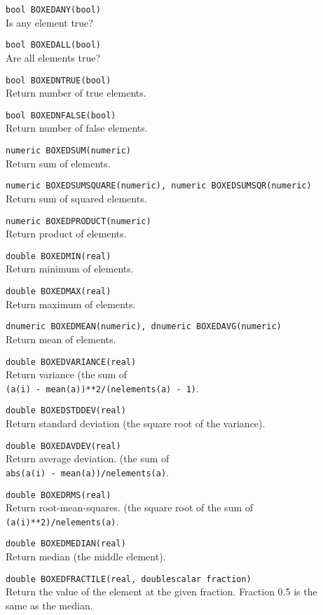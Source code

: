 \begin{description}
  \item[] \texttt{bool BOXEDANY(bool)}\\
    Is any element true?
  \item[] \texttt{bool BOXEDALL(bool)}\\
    Are all elements true?
  \item[] \texttt{bool BOXEDNTRUE(bool)}\\
    Return number of true elements.
  \item[] \texttt{bool BOXEDNFALSE(bool)}\\
    Return number of false elements.
  \item[] \texttt{numeric BOXEDSUM(numeric)}\\
    Return sum of elements.
  \item[] \texttt{numeric BOXEDSUMSQUARE(numeric), numeric BOXEDSUMSQR(numeric)}\\
    Return sum of squared elements.
  \item[] \texttt{numeric BOXEDPRODUCT(numeric)}\\
    Return product of elements.
  \item[] \texttt{double BOXEDMIN(real)}\\
    Return minimum of elements.
  \item[] \texttt{double BOXEDMAX(real)}\\
    Return maximum of elements.
  \item[] \texttt{dnumeric BOXEDMEAN(numeric), dnumeric BOXEDAVG(numeric)}\\
    Return mean of elements.
  \item[] \texttt{double BOXEDVARIANCE(real)}\\
    Return variance (the sum of
    \\\texttt{(a(i) - mean(a))**2/(nelements(a) - 1)}.
  \item[] \texttt{double BOXEDSTDDEV(real)}\\
    Return standard deviation (the square root of the variance).
  \item[] \texttt{double BOXEDAVDEV(real)}\\
    Return average deviation. (the sum of 
    \\\texttt{abs(a(i) - mean(a))/nelements(a)}.
  \item[] \texttt{double BOXEDRMS(real)}\\
    Return root-mean-squares. (the square root of the sum of
    \\\texttt{(a(i)**2)/nelements(a)}.
  \item[] \texttt{double BOXEDMEDIAN(real)}\\
    Return median (the middle element).
  \item[] \texttt{double BOXEDFRACTILE(real, doublescalar fraction)}\\
    Return the value of the element at the given fraction.
    Fraction 0.5 is the same as the median.
\end{description}

